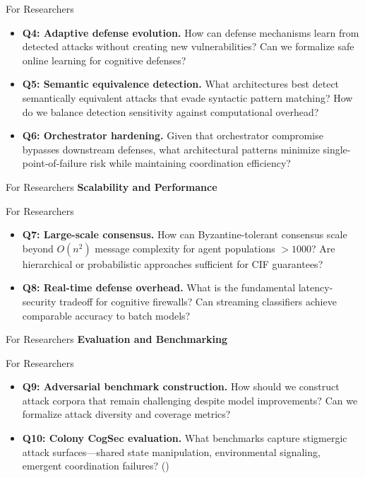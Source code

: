 \documentclass[
  ignorenonframetext,
]{beamer}
\providecommand{\cref}[1]{\texttt{\detokenize{#1}}}
\begin{document}
\begin{frame}[allowframebreaks]{For Researchers}
\begin{itemize}
\item
  \textbf{Q4: Adaptive defense evolution.} How can defense mechanisms
  learn from detected attacks without creating new vulnerabilities? Can
  we formalize safe online learning for cognitive defenses?
\item
  \textbf{Q5: Semantic equivalence detection.} What architectures best
  detect semantically equivalent attacks that evade syntactic pattern
  matching? How do we balance detection sensitivity against
  computational overhead?
\item
  \textbf{Q6: Orchestrator hardening.} Given that orchestrator
  compromise bypasses downstream defenses, what architectural patterns
  minimize single-point-of-failure risk while maintaining coordination
  efficiency?
\end{itemize}

\end{frame}

\begin{frame}[allowframebreaks]{For Researchers}
\textbf{Scalability and Performance}

\end{frame}

\begin{frame}[allowframebreaks]{For Researchers}
\begin{itemize}
\item
  \textbf{Q7: Large-scale consensus.} How can Byzantine-tolerant
  consensus scale beyond \(O(n^2)\) message complexity for agent
  populations \(>1000\)? Are hierarchical or probabilistic approaches
  sufficient for CIF guarantees?
\item
  \textbf{Q8: Real-time defense overhead.} What is the fundamental
  latency-security tradeoff for cognitive firewalls? Can streaming
  classifiers achieve comparable accuracy to batch models?
\end{itemize}

\end{frame}

\begin{frame}[allowframebreaks]{For Researchers}
\textbf{Evaluation and Benchmarking}

\end{frame}

\begin{frame}[allowframebreaks]{For Researchers}
\begin{itemize}
\item
  \textbf{Q9: Adversarial benchmark construction.} How should we
  construct attack corpora that remain challenging despite model
  improvements? Can we formalize attack diversity and coverage metrics?
\item
  \textbf{Q10: Colony CogSec evaluation.} What benchmarks capture
  stigmergic attack surfaces---shared state manipulation, environmental
  signaling, emergent coordination failures?
  (\cref{sec:eusocial-cogsec})
\end{itemize}

\end{frame}
\end{document}
